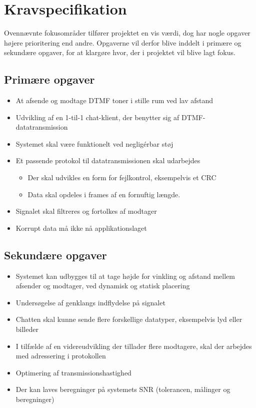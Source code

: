 \section{Kravspecifikation}

Ovennævnte fokusområder tilfører projektet en vis værdi, dog har nogle opgaver højere prioritering end andre. Opgaverne vil derfor blive inddelt i primære og sekundære opgaver, for at klargøre hvor, der i projektet vil blive lagt fokus.

\subsection{Primære opgaver}

\begin{itemize}[noitemsep]
  \item At afsende og modtage DTMF toner i stille rum ved lav afstand
  \item Udvikling af en 1-til-1 chat-klient, der benytter sig af DTMF-datatransmission
  \item Systemet skal være funktionelt ved negligérbar støj
  \item Et passende protokol til datatransmissionen skal udarbejdes
  \begin{itemize}[noitemsep]
    \item Der skal udvikles en form for fejlkontrol, eksempelvis et CRC
    \item Data skal opdeles i frames af en fornuftig længde.
  \end{itemize}
  \item Signalet skal filtreres og fortolkes af modtager
  \item Korrupt data må ikke nå applikationslaget
\end{itemize}

\subsection{Sekundære opgaver}

\begin{itemize}[noitemsep]
\item Systemet kan udbygges til at tage højde for vinkling og afstand mellem afsender og modtager, ved dynamisk og statisk placering
\item Undersøgelse af genklangs indflydelse på signalet
\item Chatten skal kunne sende flere forskellige datatyper, eksempelvis lyd eller billeder
\item I tilfælde af en videreudvikling der tillader flere modtagere, skal der arbejdes med adressering i protokollen
\item Optimering af transmissionshastighed
\item Der kan laves beregninger på systemets SNR (tolerancen, målinger og beregninger)
\end{itemize}